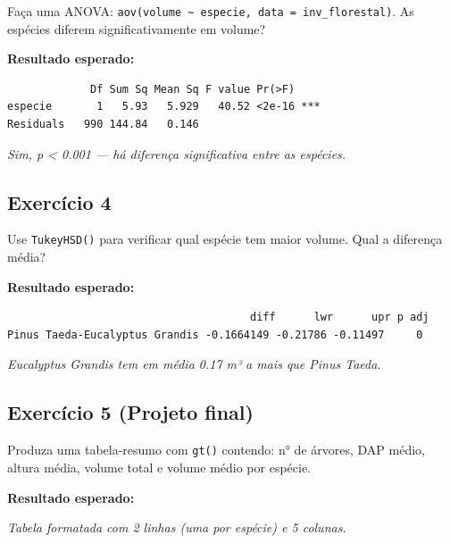 \documentclass[
  letterpaper,
]{scrbook}
\begin{document}
Faça uma ANOVA:
\texttt{aov(volume\ \textasciitilde{}\ especie,\ data\ =\ inv\_florestal)}.
As espécies diferem significativamente em volume?

\textbf{Resultado esperado:}

\begin{verbatim}
             Df Sum Sq Mean Sq F value Pr(>F)    
especie       1   5.93   5.929   40.52 <2e-16 ***
Residuals   990 144.84   0.146
\end{verbatim}

\emph{Sim, p \textless{} 0.001 --- há diferença significativa entre as
espécies.}

\subsection{Exercício 4}\label{exercuxedcio-4-10}

Use \texttt{TukeyHSD()} para verificar qual espécie tem maior volume.
Qual a diferença média?

\textbf{Resultado esperado:}

\begin{verbatim}
                                      diff      lwr      upr p adj
Pinus Taeda-Eucalyptus Grandis -0.1664149 -0.21786 -0.11497     0
\end{verbatim}

\emph{Eucalyptus Grandis tem em média 0.17 m³ a mais que Pinus Taeda.}

\subsection{Exercício 5 (Projeto
final)}\label{exercuxedcio-5-projeto-final}

Produza uma tabela-resumo com \texttt{gt()} contendo: n° de árvores, DAP
médio, altura média, volume total e volume médio por espécie.

\textbf{Resultado esperado:}

\emph{Tabela formatada com 2 linhas (uma por espécie) e 5 colunas.}


\backmatter
\end{document}
